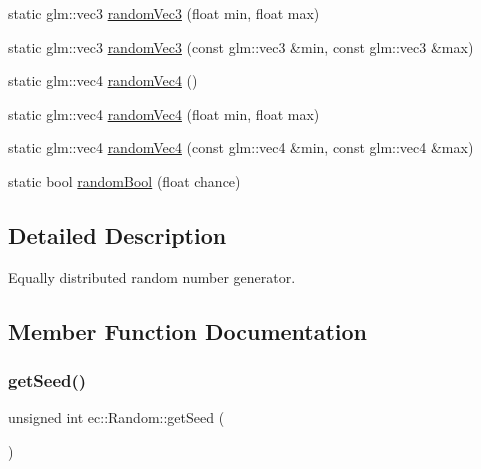 \begin{DoxyCompactItemize}
\item 
static glm\+::vec3 \mbox{\hyperlink{classec_1_1_random_a84ec2078788971de906b5f2f17a61d55}{random\+Vec3}} (float min, float max)
\item 
static glm\+::vec3 \mbox{\hyperlink{classec_1_1_random_ae3f46b4ffbbceb18e0b9c3a2b4780710}{random\+Vec3}} (const glm\+::vec3 \&min, const glm\+::vec3 \&max)
\item 
static glm\+::vec4 \mbox{\hyperlink{classec_1_1_random_a14fae11ffad84de3a030d5f218192bcf}{random\+Vec4}} ()
\item 
static glm\+::vec4 \mbox{\hyperlink{classec_1_1_random_aaa2a5ec20d1e3c2b44e75ada89519982}{random\+Vec4}} (float min, float max)
\item 
static glm\+::vec4 \mbox{\hyperlink{classec_1_1_random_a27ef90c2ba082e044fb523dd2ecf66bf}{random\+Vec4}} (const glm\+::vec4 \&min, const glm\+::vec4 \&max)
\item 
static bool \mbox{\hyperlink{classec_1_1_random_ae8d7f55e5847d7c83e72539b5517dc8d}{random\+Bool}} (float chance)
\end{DoxyCompactItemize}


\subsection{Detailed Description}
Equally distributed random number generator. 

\subsection{Member Function Documentation}
\mbox{\label{classec_1_1_random_a59c8074b3adbaa81ad9e82d3f398b441}} 
\subsubsection{\texorpdfstring{get\+Seed()}{getSeed()}}
{\footnotesize\ttfamily unsigned int ec\+::\+Random\+::get\+Seed (\begin{DoxyParamCaption}{ }\end{DoxyParamCaption})\hspace{0.3cm}{\ttfamily [static]}}

\mbox{\label{classec_1_1_random_ae8d7f55e5847d7c83e72539b5517dc8d}} 

